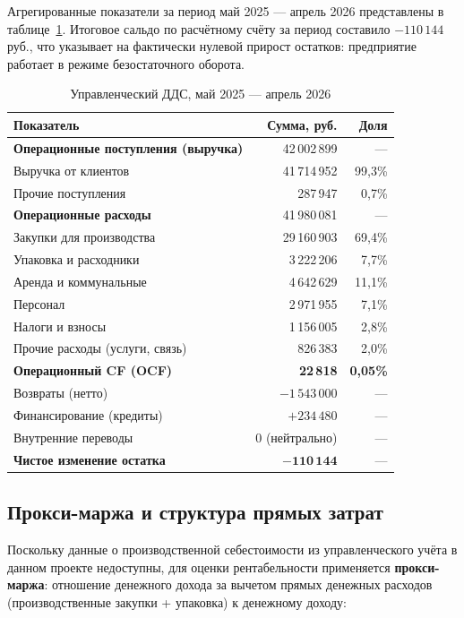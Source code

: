 Агрегированные показатели за период май 2025 --- апрель 2026 представлены в таблице~\ref{tab:dds_summary}. Итоговое сальдо по расчётному счёту за период составило $-110\,144$ руб., что указывает на фактически нулевой прирост остатков: предприятие работает в режиме безостаточного оборота.

\begin{table}[H]
\centering
\caption{Управленческий ДДС, май 2025 --- апрель 2026}
\label{tab:dds_summary}
\begin{tabular}{lrr}
\toprule
\textbf{Показатель} & \textbf{Сумма, руб.} & \textbf{Доля} \\
\midrule
\textbf{Операционные поступления (выручка)} & 42\,002\,899 & --- \\
\quad Выручка от клиентов & 41\,714\,952 & 99,3\% \\
\quad Прочие поступления & 287\,947 & 0,7\% \\
\midrule
\textbf{Операционные расходы} & 41\,980\,081 & --- \\
\quad Закупки для производства & 29\,160\,903 & 69,4\% \\
\quad Упаковка и расходники & 3\,222\,206 & 7,7\% \\
\quad Аренда и коммунальные & 4\,642\,629 & 11,1\% \\
\quad Персонал & 2\,971\,955 & 7,1\% \\
\quad Налоги и взносы & 1\,156\,005 & 2,8\% \\
\quad Прочие расходы (услуги, связь) & 826\,383 & 2,0\% \\
\midrule
\textbf{Операционный CF (OCF)} & \textbf{22\,818} & \textbf{0,05\%} \\
\midrule
Возвраты (нетто) & $-1\,543\,000$ & --- \\
Финансирование (кредиты) & $+234\,480$ & --- \\
Внутренние переводы & $0$ (нейтрально) & --- \\
\midrule
\textbf{Чистое изменение остатка} & $\mathbf{-110\,144}$ & --- \\
\bottomrule
\end{tabular}
\end{table}

\subsection{Прокси-маржа и структура прямых затрат}

Поскольку данные о производственной себестоимости из управленческого учёта в данном проекте недоступны, для оценки рентабельности применяется \textbf{прокси-маржа}: отношение денежного дохода за вычетом прямых денежных расходов (производственные закупки + упаковка) к денежному доходу:

